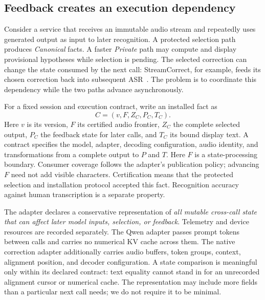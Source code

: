 \subsection{Feedback creates an execution dependency}
Consider a service that receives an immutable audio stream and repeatedly
uses generated output as input to later recognition. A protected selection
path produces \emph{Canonical} facts. A faster \emph{Private} path may
compute and display provisional hypotheses while selection is pending.
The selected correction can change the state consumed by the next call:
StreamCorrect, for example, feeds its chosen correction back into subsequent
ASR~\cite{vu2026streamcorrect}. The problem is to coordinate this dependency
while the two paths advance asynchronously.

For a fixed session and execution contract, write an installed fact as
\begin{equation}
 C=(v,F,Z_C,P_C,T_C).
 \label{eq:canonical}
\end{equation}
Here $v$ is its version, $F$ its certified audio frontier, $Z_C$ the complete
selected output, $P_C$ the feedback state for later calls, and $T_C$ its bound
display text. A contract specifies the model, adapter, decoding configuration,
audio identity, and transformations from a complete output to $P$ and $T$.
Here $F$ is a state-processing boundary. Consumer coverage follows the
adapter's publication policy; advancing $F$ need not add visible characters.
Certification means that the protected selection and installation protocol
accepted this fact. Recognition accuracy against human transcription is a
separate property.

The adapter declares a conservative representation of \emph{all mutable
cross-call state that can affect later model inputs, selection, or feedback}.
Telemetry and device resources are recorded separately. The Qwen adapter passes prompt
tokens between calls and carries no numerical KV cache across them. The
native correction adapter additionally carries audio buffers, token groups,
context, alignment position, and decoder configuration. A state comparison
is meaningful only within its declared contract: text equality cannot stand
in for an unrecorded alignment cursor or numerical cache. The representation
may include more fields than a particular next call needs; we do not require
it to be minimal.

